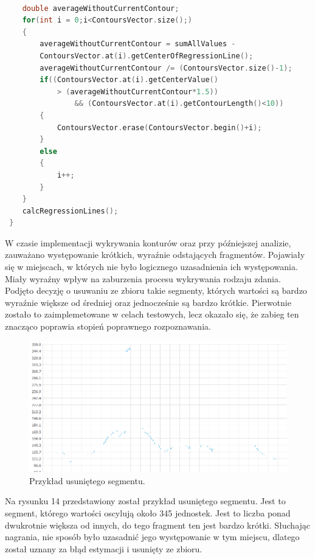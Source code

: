 \documentclass[a4paper,12 pt]{report}
\begin{document}
\begin{lstlisting}[caption={Dalsza część głównej funkcji findContours},label={lst:label},language=C++]

    double averageWithoutCurrentContour;
    for(int i = 0;i<ContoursVector.size();)
    {
        averageWithoutCurrentContour = sumAllValues - 
        ContoursVector.at(i).getCenterOfRegressionLine();
        averageWithoutCurrentContour /= (ContoursVector.size()-1);
        if((ContoursVector.at(i).getCenterValue() 
        	> (averageWithoutCurrentContour*1.5))
                && (ContoursVector.at(i).getContourLength()<10))
        {
            ContoursVector.erase(ContoursVector.begin()+i);
        }
        else
        {
            i++;
        }
    }
    calcRegressionLines();
 }
\end{lstlisting}
W czasie implementacji wykrywania konturów oraz przy późniejszej analizie, zauważano występowanie krótkich, wyraźnie odstających fragmentów. Pojawiały się w miejscach, w których nie było logicznego uzasadnienia ich występowania. Miały wyraźny wpływ na zaburzenia procesu wykrywania rodzaju zdania.
Podjęto decyzję o usuwaniu ze zbioru takie segmenty, których wartości są bardzo wyraźnie większe od średniej oraz jednocześnie są bardzo krótkie. Pierwotnie zostało to zaimplemetowane w celach testowych, lecz okazało się, że zabieg ten znacząco poprawia stopień poprawnego rozpoznawania.
 \FloatBarrier
\begin{figure}[h]
\centering
\includegraphics[scale=1.0]{usuniety_kontur.png}
\caption{Przykład usuniętego segmentu.}
\end{figure}
\FloatBarrier
Na rysunku 14 przedstawiony został przykład usuniętego segmentu. Jest to segment, którego wartości oscylują około 345 jednostek. Jest to liczba ponad dwukrotnie większa od innych, do tego fragment ten jest bardzo krótki.
Słuchając nagrania, nie sposób było uzasadnić jego występowanie w tym miejscu, dlatego został uznany za błąd estymacji i usunięty ze zbioru. 
\end{document}
